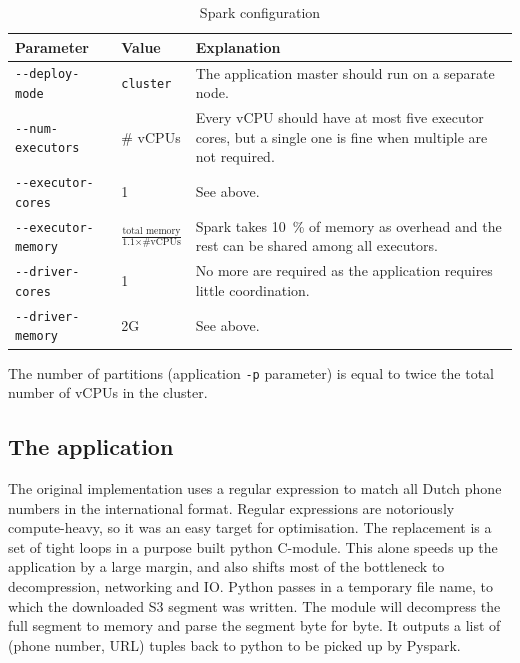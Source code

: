 \documentclass{article}
\begin{document}
\begin{table}[H]
	\caption{Spark configuration}
	\label{tab:spark-config}
	\centering

	\begin{tabular}{llp{6cm}}
	\toprule
	Parameter					& Value	& Explanation \\
	\midrule
	\texttt{-{}-deploy-mode} 		& \texttt{cluster}				& The application master should run on a separate node. \\
	\texttt{-{}-num-executors}	& \# vCPUs		  				& Every vCPU should have at most five executor cores, but a single one is fine when multiple are not required. \\
	\texttt{-{}-executor-cores}	& 1								& See above. \\
	\texttt{-{}-executor-memory}	& $\frac{\text{total memory}}{\text{1.1} \times \text{\# vCPUs}}$	& Spark takes \SI{10}{\percent} of memory as overhead and the rest can be shared among all executors. \\
	\texttt{-{}-driver-cores}		& 1								& No more are required as the application requires little coordination. \\
	\texttt{-{}-driver-memory}	& 2G							& See above. \\
	\bottomrule
	\end{tabular}
\end{table}

The number of partitions (application \texttt{-p} parameter) is equal to twice the total number of vCPUs in the cluster.

\subsection{The application}
The original implementation uses a regular expression to match all Dutch phone numbers in the international format.
Regular expressions are notoriously compute-heavy, so it was an easy target for optimisation.
The replacement is a set of tight loops in a purpose built python C-module.
This alone speeds up the application by a large margin, and also shifts most of the bottleneck to decompression, networking and IO.
Python passes in a temporary file name, to which the downloaded S3 segment was written.
The module will decompress the full segment to memory and parse the segment byte for byte.
It outputs a list of (phone number, URL) tuples back to python to be picked up by Pyspark.
\end{document}
